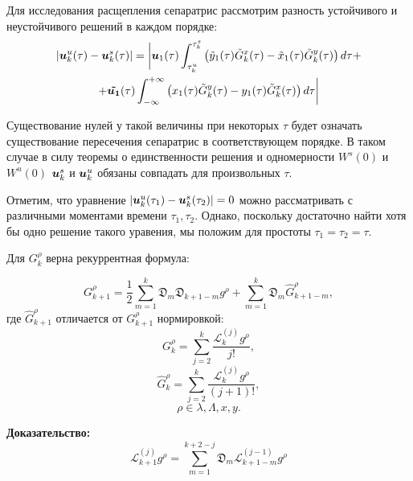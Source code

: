 Для исследования расщепления сепаратрис рассмотрим разность устойчивого и неустойчивого решений в каждом порядке:
\begin{multline}
        |\boldsymbol{u}_k^u(\tau)-\boldsymbol{u}_k^s(\tau)| = \bigg| \boldsymbol{u}_1(\tau)\int_{\tau^u_k}^{\tau^s_k} \left( \tilde y_1(\tau) \tilde G_k^x(\tau) - \tilde x_1(\tau) \tilde G_k^y(\tau) \right) d \tau + \\
        +\boldsymbol{ \tilde{u_1}}(\tau) \int_{-\infty}^{+\infty} \left( x_1(\tau) \tilde G_k^y(\tau) - y_1(\tau) \tilde G_k^x(\tau) \right) d \tau \bigg|
\label{rasshep}
\end{multline}

Существование нулей у такой величины при некоторых $\tau$ будет означать существование пересечения сепаратрис в соответствующем порядке. В таком случае в силу теоремы о единственности решения и одномерности $W^s(0)$ и $W^u(0)$ $\boldsymbol{u}_k^s$ и $\boldsymbol{u}_k^u$ обязаны совпадать для произвольных $\tau$.

Отметим, что уравнение $|\boldsymbol{u}_k^u(\tau_1)-\boldsymbol{u}_k^s(\tau_2)|=0$ можно рассматривать с различными моментами времени $\tau_1, \tau_2$. Однако, поскольку достаточно найти хотя бы одно решение такого уравения, мы положим  для простоты $\tau_1=\tau_2=\tau$.


\begin{utv}

Для $G_k^\rho$ верна рекуррентная формула:

\begin{equation*}
G_{k+1}^\rho = \frac12 \sum_{m=1}^k \mathfrak{D}_m \mathfrak{D}_{k+1-m} g^\rho + \sum_{m=1}^k \mathfrak{D}_m \hat G_{k+1-m}^\rho,
\end{equation*}
где $\hat G_{k+1}^\rho$ отличается от $G_{k+1}^\rho$ нормировкой:
$$G_k^\rho = \sum_{j=2}^{k} \frac{\mathcal{L}_k^{(j)} g^\rho }{j!},$$
$$\hat G_k^\rho = \sum_{j=2}^{k} \frac{\mathcal{L}_k^{(j)} g^\rho }{(j+1)!},$$
$$\rho \in {\lambda, \Lambda, x, y}.$$
\end{utv}
\textbf{Доказательство:}\nopagebreak[4]
$$\mathcal{L}_{k+1}^{(j)}g^\rho = \sum_{m=1}^{k+2-j} \mathfrak{D}_m \mathcal{L}_{k+1-m}^{(j-1)} g^\rho$$

